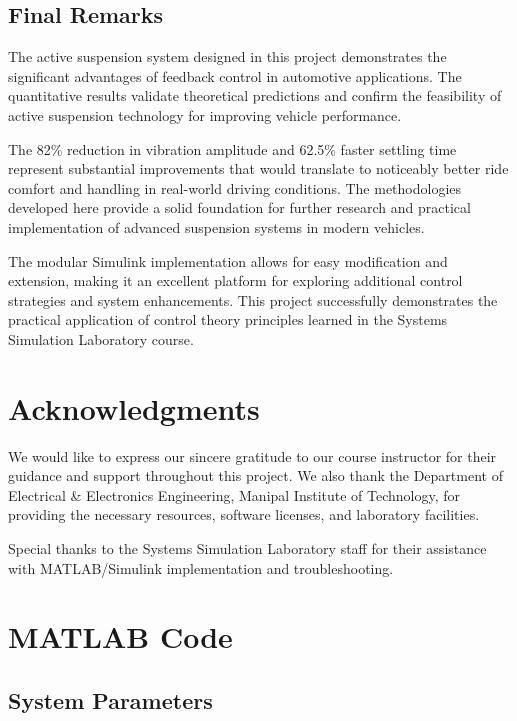 \documentclass[12pt,a4paper]{article}
\begin{document}
\subsection{Final Remarks}

The active suspension system designed in this project demonstrates the significant advantages of feedback control in automotive applications. The quantitative results validate theoretical predictions and confirm the feasibility of active suspension technology for improving vehicle performance. 

The 82\% reduction in vibration amplitude and 62.5\% faster settling time represent substantial improvements that would translate to noticeably better ride comfort and handling in real-world driving conditions. The methodologies developed here provide a solid foundation for further research and practical implementation of advanced suspension systems in modern vehicles.

The modular Simulink implementation allows for easy modification and extension, making it an excellent platform for exploring additional control strategies and system enhancements. This project successfully demonstrates the practical application of control theory principles learned in the Systems Simulation Laboratory course.

\section*{Acknowledgments}

We would like to express our sincere gratitude to our course instructor for their guidance and support throughout this project. We also thank the Department of Electrical \& Electronics Engineering, Manipal Institute of Technology, for providing the necessary resources, software licenses, and laboratory facilities.

Special thanks to the Systems Simulation Laboratory staff for their assistance with MATLAB/Simulink implementation and troubleshooting.

\newpage
\appendix

\section{MATLAB Code}

\subsection{System Parameters}
\end{document}
